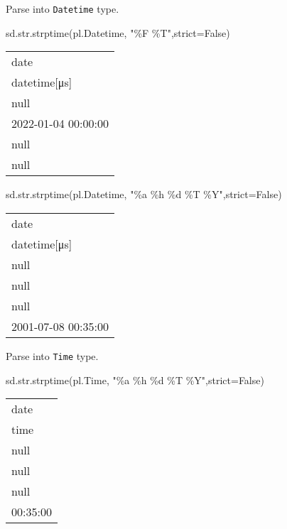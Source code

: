 \documentclass[
  letterpaper,
  DIV=11,
  numbers=noendperiod]{scrartcl}
\newenvironment{Shaded}{\begin{snugshade}}{\end{snugshade}}
\newcommand{\BuiltInTok}[1]{\textcolor[rgb]{0.00,0.23,0.31}{#1}}
\newcommand{\NormalTok}[1]{\textcolor[rgb]{0.00,0.23,0.31}{#1}}
\newcommand{\OperatorTok}[1]{\textcolor[rgb]{0.37,0.37,0.37}{#1}}
\newcommand{\SpecialCharTok}[1]{\textcolor[rgb]{0.37,0.37,0.37}{#1}}
\newcommand{\StringTok}[1]{\textcolor[rgb]{0.13,0.47,0.30}{#1}}
\newcommand{\VariableTok}[1]{\textcolor[rgb]{0.07,0.07,0.07}{#1}}
\begin{document}
Parse into \texttt{Datetime} type.

\begin{Shaded}
\begin{Highlighting}[]
\NormalTok{sd.}\BuiltInTok{str}\NormalTok{.strptime(pl.Datetime, }\StringTok{"}\SpecialCharTok{\%F}\StringTok{ \%T"}\NormalTok{,strict}\OperatorTok{=}\VariableTok{False}\NormalTok{)}
\end{Highlighting}
\end{Shaded}

\begin{longtable}[]{@{}l@{}}
\toprule()
date \\
datetime{[}μs{]} \\
\midrule()
\endhead
null \\
2022-01-04 00:00:00 \\
null \\
null \\
\bottomrule()
\end{longtable}

\begin{Shaded}
\begin{Highlighting}[]
\NormalTok{sd.}\BuiltInTok{str}\NormalTok{.strptime(pl.Datetime, }\StringTok{"\%a \%h }\SpecialCharTok{\%d}\StringTok{ \%T \%Y"}\NormalTok{,strict}\OperatorTok{=}\VariableTok{False}\NormalTok{)}
\end{Highlighting}
\end{Shaded}

\begin{longtable}[]{@{}l@{}}
\toprule()
date \\
datetime{[}μs{]} \\
\midrule()
\endhead
null \\
null \\
null \\
2001-07-08 00:35:00 \\
\bottomrule()
\end{longtable}

Parse into \texttt{Time} type.

\begin{Shaded}
\begin{Highlighting}[]
\NormalTok{sd.}\BuiltInTok{str}\NormalTok{.strptime(pl.Time, }\StringTok{"\%a \%h }\SpecialCharTok{\%d}\StringTok{ \%T \%Y"}\NormalTok{,strict}\OperatorTok{=}\VariableTok{False}\NormalTok{)}
\end{Highlighting}
\end{Shaded}

\begin{longtable}[]{@{}l@{}}
\toprule()
date \\
time \\
\midrule()
\endhead
null \\
null \\
null \\
00:35:00 \\
\bottomrule()
\end{longtable}
\end{document}
